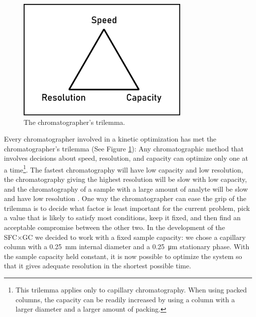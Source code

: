 \begin{figure}
\centering
\includegraphics[width=0.75\textwidth]{Figures/Triangle.pdf}
\decoRule
\caption[Schematic diagram of a the chromatographer's trilemma.]{The chromatographer's trilemma.}
\label{fig:trilemma}
\end{figure}


Every chromatographer involved in a kinetic optimization has met the
chromatographer's trilemma (See Figure \ref{fig:trilemma}): Any chromatographic
method that involves decisions about speed, resolution, and capacity can
optimize only one at a time\footnote{This trilemma applies only to capillary
chromatography. When using packed columns, the capacity can be readily increased
by using a column with a larger diameter and a larger amount of packing.}. The
fastest chromatography will have low capacity and low resolution, the
chromatography giving the highest resolution will be slow with low capacity, and
the chromatography of a sample with a large amount of analyte will be slow
and have low resolution \autocite{Klee2002}. One way the chromatographer can
ease the grip of the trilemma is to decide what factor is least important for
the current problem, pick a value that is likely to satisfy most
conditions, keep it fixed, and then find an acceptable compromise between the
other two. In the development of the SFC×GC we decided to work with a fixed
sample capacity: we chose a capillary column with a \SI{0.25}{\milli\metre}
internal diameter and a \SI{0.25}{\micro\metre} stationary phase. With the
sample capacity held constant, it is now possible to optimize the system so that
it gives adequate resolution in the shortest possible time.

